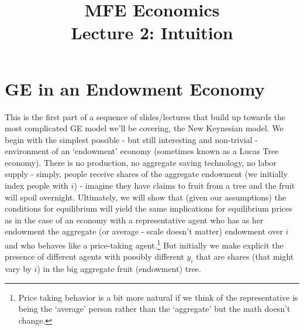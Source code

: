 \documentclass[authoryear,11pt]{elsarticle}
\begin{document}
\begin{frontmatter}
\title{MFE Economics\\Lecture 2: Intuition}
\end{frontmatter}


\section{GE in an Endowment Economy}
This is the first part of a sequence of slides/lectures that build up towards the most complicated GE model we'll be covering, the New Keynesian model. We begin with the simplest possible - but still interesting and non-trivial - environment of an `endowment' economy (sometimes known as a Lucas Tree economy). There is no production, no aggregate saving technology, no labor supply - simply, people receive shares of the aggregate endowment (we initially index people with $i$) - imagine they have claims to fruit from a tree and the fruit will spoil overnight. Ultimately, we will show that (given our assumptions) the conditions for equilibrium will yield the same implications for equilibrium prices as in the case of an economy with a representative agent who has as her endowment the aggregate (or average - scale doesn't matter) endowment over $i$ and who behaves like a price-taking agent.\footnote{Price taking behavior is a bit more natural if we think of the representative is being the `average' person rather than the `aggregate' but the math doesn't change.} But initially we make explicit the presence of different agents with possibly different $y_{i}$ that are shares (that might vary by $i$) in the big aggregate fruit (endowment) tree.
\end{document}
